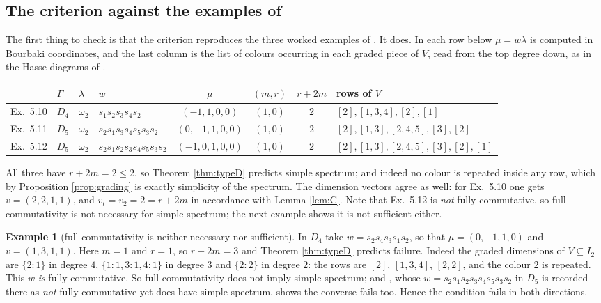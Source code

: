 \documentclass[reqno]{amsart}
\theoremstyle{plain}
\theoremstyle{definition}
\newtheorem{example}[theorem]{Example}
\newcommand{\la}{\lambda}
\newcommand{\om}{\omega}
\begin{document}
\subsection{The criterion against the examples of \cite{DKK}}
The first thing to check is that the criterion reproduces the three worked
examples of \cite[\S5.4]{DKK}.  It does.  In each row below $\mu=w\la$ is
computed in Bourbaki coordinates, and the last column is the list of colours
occurring in each graded piece of $V$, read from the top degree down, as in the
Hasse diagrams of \cite[pp.~82--83]{DKK}.

\begin{center}
\renewcommand{\arraystretch}{1.25}
\begin{tabular}{llllcccl}
\hline
\cite{DKK} & $\Gamma$ & $\la$ & $w$ & $\mu$ & $(m,r)$ & $r+2m$ & rows of $V$\\
\hline
Ex.~5.10 & $D_4$ & $\om_2$ & $s_1s_2s_3s_4s_2$ & $(-1,1,0,0)$ & $(1,0)$ & $2$ &
$[2],[1,3,4],[2],[1]$\\
Ex.~5.11 & $D_5$ & $\om_2$ & $s_2s_1s_3s_4s_5s_3s_2$ & $(0,-1,1,0,0)$ & $(1,0)$ & $2$ &
$[2],[1,3],[2,4,5],[3],[2]$\\
Ex.~5.12 & $D_5$ & $\om_2$ & $s_2s_1s_2s_3s_4s_5s_3s_2$ & $(-1,0,1,0,0)$ & $(1,0)$ & $2$ &
$[2],[1,3],[2,4,5],[3],[2],[1]$\\
\hline
\end{tabular}
\end{center}

All three have $r+2m=2\le2$, so Theorem \ref{thm:typeD} predicts simple
spectrum; and indeed no colour is repeated inside any row, which by Proposition
\ref{prop:grading} is exactly simplicity of the spectrum.  The dimension
vectors agree as well: for Ex.~5.10 one gets $v=(2,2,1,1)$, and $v_t=v_2=2=r+2m$
in accordance with Lemma \ref{lem:C}.  Note that Ex.~5.12 is \emph{not} fully
commutative, so full commutativity is not necessary for simple spectrum; the
next example shows it is not sufficient either.

\begin{example}[full commutativity is neither necessary nor sufficient]
\label{ex:fcbad}
In $D_4$ take $w=s_2s_4s_3s_1s_2$, so that $\mu=(0,-1,1,0)$ and $v=(1,3,1,1)$.
Here $m=1$ and $r=1$, so $r+2m=3$ and Theorem \ref{thm:typeD} predicts failure.
Indeed the graded dimensions of $V\subseteq I_2$ are $\{2:1\}$ in degree $4$,
$\{1:1,3:1,4:1\}$ in degree $3$ and $\{2:2\}$ in degree $2$: the rows are
$[2]$, $[1,3,4]$, $[2,2]$, and the colour $2$ is repeated.  This $w$ \emph{is}
fully commutative.  So full commutativity does not imply simple spectrum;
and \cite[Ex.~5.12]{DKK}, whose $w=s_2s_1s_2s_3s_4s_5s_3s_2$ in $D_5$ is
recorded there as \emph{not} fully commutative yet does have simple spectrum,
shows the converse fails too.  Hence the condition fails in both directions.
\end{example}
\end{document}
